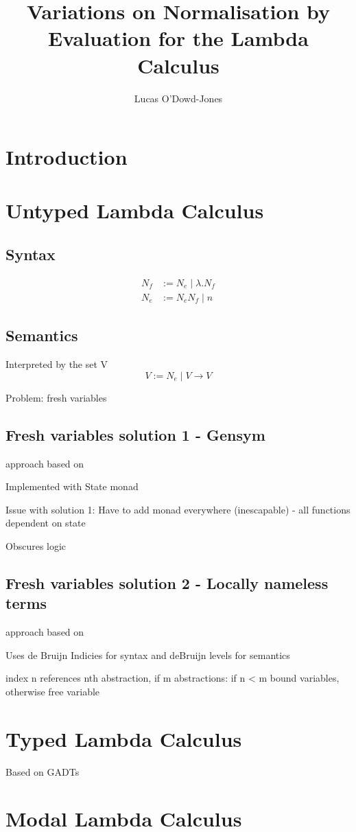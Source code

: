\documentclass{article}
\title{Variations on Normalisation by Evaluation for the Lambda Calculus }
\author{Lucas O'Dowd-Jones}
\date{}
\begin{document}
\maketitle

\section{Introduction}

\section{Untyped Lambda Calculus}

\subsection{Syntax}
\begin{align}
    N_f &:= N_e \mid \lambda.N_f  \\
    N_e &:= N_e N_f \mid n
\end{align}
\cite{slides}

\subsection{Semantics}
Interpreted by the set V \cite{slides}
$$
    V := N_e \mid V \rightarrow V
$$

Problem: fresh variables

\subsection{Fresh variables solution 1 - Gensym}
approach based on \cite{slides}

Implemented with State monad

Issue with solution 1: Have to add monad everywhere (inescapable) - all functions dependent on state

Obscures logic

\subsection{Fresh variables solution 2 - Locally nameless terms}
approach based on \cite{deBruijn}

Uses de Bruijn Indicies for syntax and deBruijn levels for semantics

index n references nth abstraction,
if m abstractions: if n < m bound variables, otherwise free variable

\section{Typed Lambda Calculus}
Based on GADTs \cite{GADTs}

\section{Modal Lambda Calculus}
\cite{modalTypes}

\printbibliography
\end{document}
